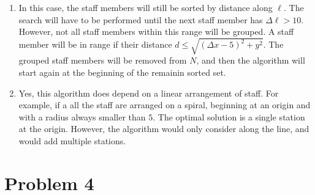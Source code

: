 \documentclass{article}
\begin{document}
\begin{enumerate}[label=\alph*)]
    \item In this case, the staff members will still be sorted by distance along $\ell$.
        The search will have to be performed until the next staff member
        has $\Delta \ell > 10$. However, not all staff members within this range will be
        grouped. A staff member will be in range if their
        distance $d \leq \sqrt{(\Delta x-5)^2 + y^2}$.
        The grouped staff members will be removed from $N$, and then the algorithm
        will start again at the beginning of the remainin sorted set.
        
    \item Yes, this algorithm does depend on a linear arrangement of staff.
        For example, if a all the staff are arranged on a spiral, beginning at an origin
        and with a  radius always smaller than $5$. The optimal solution is a single station
        at the origin. However, the algorithm would only consider along the line, and would
        add multiple stations.
\end{enumerate}

\section{Problem 4}
\end{document}
